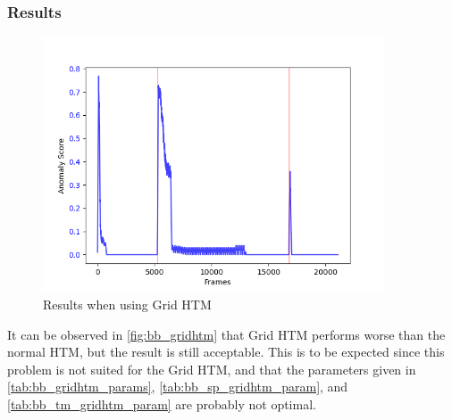 \subsubsection{Results}
\begin{figure}[H]
    \centering
    \includegraphics[width=0.9\textwidth]{resources/experiments/bouncing_ball/bb_grid}
    \caption[Bouncing Ball Experiment Anomaly Score Grid HTM]{Results when using Grid HTM}
    \label{fig:bb_gridhtm}
\end{figure}
It can be observed in \autoref{fig:bb_gridhtm} that Grid HTM performs worse than the normal HTM, but the result is still acceptable. This is to be expected since this problem is not suited for the Grid HTM, and that the parameters given in \autoref{tab:bb_gridhtm_params}, \autoref{tab:bb_sp_gridhtm_param}, and \autoref{tab:bb_tm_gridhtm_param} are probably not optimal.
